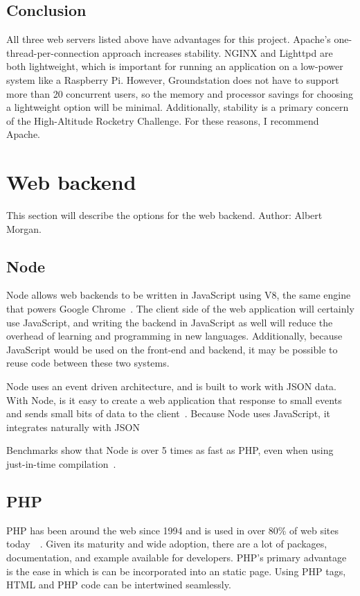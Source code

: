 \documentclass[10pt,draftclsnofoot,onecolumn]{IEEEtran}
\begin{document}
	\subsection{Conclusion}
	All three web servers listed above have advantages for this project.
	Apache's one-thread-per-connection approach increases stability.
	NGINX and Lighttpd are both lightweight, which is important for running an application on a low-power system like a Raspberry Pi.
	However, Groundstation does not have to support more than 20 concurrent users, so the memory and processor savings for choosing a lightweight option will be minimal.
	Additionally, stability is a primary concern of the High-Altitude Rocketry Challenge.
	For these reasons, I recommend Apache.


	\section{Web backend}
	This section will describe the options for the web backend. Author: Albert Morgan.
	
	\subsection{Node}
	Node allows web backends to be written in JavaScript using V8, the same engine that powers Google Chrome~\cite{node}.
	The client side of the web application will certainly use JavaScript, and writing the backend  in JavaScript as well will reduce the overhead of learning and programming in new languages.
	Additionally, because JavaScript would be used on the front-end and backend, it may be possible to reuse code between these two systems.
	
	Node uses an event driven architecture, and is built to work with \ac{JSON} data.
	With Node, is it easy to create a web application that response to small events and sends small bits of data to the client~\cite{event-driven-architecture-node-js}.
	Because Node uses JavaScript, it integrates naturally with \ac{JSON}
		
	Benchmarks show that Node is over 5 times as fast as PHP, even when using just-in-time compilation~\cite{comparing-node-vs-php-performance}.
	
	\subsection{PHP}
	PHP has been around the web since 1994 and is used in over 80\% of web sites today~\cite{history-of-php}~\cite{usage-of-server-side-programming-languages-for-websites}.
	Given its maturity and wide adoption, there are a lot of packages, documentation, and example available for developers.
	PHP's primary advantage is the ease in which is can be incorporated into an static page.
	Using PHP tags, HTML and PHP code can be intertwined seamlessly.
	
\end{document}
